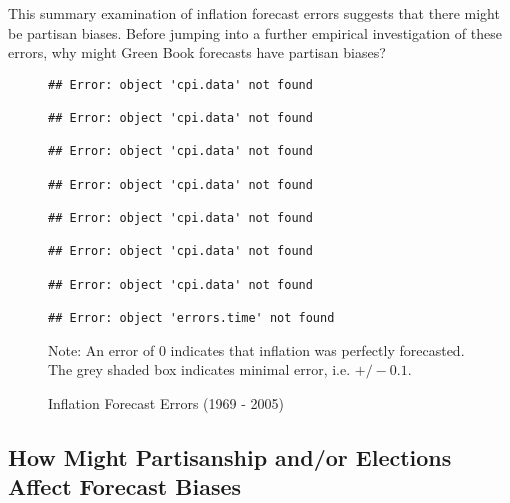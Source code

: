 \documentclass[a4paper]{article}\usepackage{graphicx, color}
\makeatletter
\newenvironment{kframe}{%
 \def\FrameCommand##1{\hskip\@totalleftmargin \hskip-\fboxsep
 \colorbox{shadecolor}{##1}\hskip-\fboxsep
     \hskip-\linewidth \hskip-\@totalleftmargin \hskip\columnwidth}%
 \MakeFramed {\advance\hsize-\width
   \@totalleftmargin\z@ \linewidth\hsize
   \@setminipage}}%
 {\par\unskip\endMakeFramed}
\newenvironment{knitrout}{}{} %
\makeatother
\begin{document}
This summary examination of inflation forecast errors suggests that there might be partisan biases. Before jumping into a further empirical investigation of these errors, why might Green Book forecasts have partisan biases?

\begin{figure}[t]
    \caption{Inflation Forecast Errors (1969 - 2005)}
    \label{errors_over_time}
    \begin{center}
    
\begin{knitrout}
\color{fgcolor}\begin{kframe}
\begin{verbatim}
## Error: object 'cpi.data' not found

## Error: object 'cpi.data' not found

## Error: object 'cpi.data' not found

## Error: object 'cpi.data' not found

## Error: object 'cpi.data' not found

## Error: object 'cpi.data' not found

## Error: object 'cpi.data' not found

## Error: object 'errors.time' not found
\end{verbatim}
\end{kframe}
\end{knitrout}

    
    \end{center}
    \begin{singlespace}
        {\scriptsize{Note: An error of 0 indicates that inflation was perfectly forecasted. \\
            The grey shaded box indicates minimal error, i.e. $+/- 0.1$.
        }}
    \end{singlespace}
\end{figure}


\subsection{How Might Partisanship and/or Elections Affect Forecast Biases}

\end{document}
